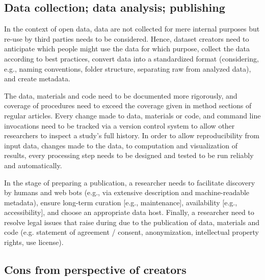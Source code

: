\subsection{Data collection; data analysis; publishing}
%
In the context of open data, data are not collected for mere internal purposes
but re-use by third parties needs to be considered.
%
Hence, dataset creators need to anticipate which people might use the data for
which purpose, collect the data according to best practices, convert data into a
standardized format (considering, e.g., naming conventions, folder structure,
separating raw from analyzed data), and create metadata.

The data, materials and code need to be documented more rigorously, and coverage
of procedures need to exceed the coverage given in method sections of regular
articles.
%
Every change made to data, materials or code, and command line invocations need
to be tracked via a version control system \citep[e.g.,][]{halchenko2021datalad}
to allow other researchers to inspect a study's full history.
%
In order to allow reproducibility from input data, changes made to the data, to
computation and visualization of results, every processing step needs to be
designed and tested to be run reliably and automatically.

In the stage of preparing a publication, a researcher needs to facilitate
discovery by humans and web bots (e.g., via extensive description and
machine-readable metadata), ensure long-term curation [e.g., maintenance],
availability [e.g., accessibility], and choose an appropriate data host.
Finally, a researcher need to resolve legal issues that raise during due to the
publication of data, materials and code (e.g. statement of agreement / consent,
anonymization, intellectual property rights, use license).


\subsection{Cons from perspective of creators}



